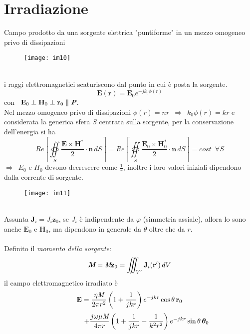 \documentclass[a4paper]{article}
\let\oldoiint\oiint
\renewcommand{\oiint}{\oldoiint\limits}
\begin{document}
\section{Irradiazione}
Campo prodotto da una sorgente elettrica "puntiforme" in un mezzo omogeneo privo di dissipazioni
\begin{figure}[ht] 
\centering
\texttt{[image: im10]}
\end{figure}
\\i raggi elettromagnetici scaturiscono dal punto in cui è posta la sorgente.
\begin{equation*}
\textbf{E}(\textbf{r})=\textbf{E}_0e^{-jk_0\phi(r)}
\end{equation*}
con $\,\,\,\textbf{E}_0\perp\textbf{H}_0\perp\textbf{r}_0\parallel\emph{\textbf{P}}$.\\
Nel mezzo omogeneo privo di dissipazioni $\phi(r)=nr\,\,\,\Rightarrow\,\,\,k_0\phi(r)=kr$ e considerata la generica sfera $S$ centrata sulla sorgente, per la conservazione dell'energia si ha
\begin{equation*}
Re\left[\oiint_S\frac{\textbf{E}\times\textbf{H}^*}{2}\cdot\textbf{n}\,dS\right]=Re\left[\oiint_S\frac{\textbf{E}_0\times\textbf{H}_0^*}{2}\cdot\textbf{n}\,dS\right]=cost\,\,\,\forall S
\end{equation*}
$\Rightarrow\,\,\,E_0$ e $H_0$ devono decrescere come $\frac{1}{r}$, inoltre i loro valori iniziali dipendono dalla corrente di sorgente.
\begin{figure}[ht] 
\centering
\texttt{[image: im11]}
\end{figure}
\\Assunta $\textbf{J}_i=J_i\textbf{z}_0$, se $J_i$ è indipendente da $\varphi$ (simmetria assiale), allora lo sono anche $\textbf{E}_0$ e $\textbf{H}_0$, ma dipendono in generale da $\theta$ oltre che da $r$.\\\\
Definito il \emph{momento della sorgente}:
\begin{equation*}
\emph{\textbf{M}}=\emph{M}\textbf{z}_0=\iiint_{V'}\textbf{J}_i(\textbf{r}')\,dV
\end{equation*}
il campo elettromagnetico irradiato è
\begin{equation*}
\textbf{E}=\frac{\eta\emph{M}}{2\pi r^2}\left(1+\frac{1}{jkr}\right)e^{-jkr}\cos\theta\,\textbf{r}_0
\end{equation*}
\begin{equation*}
\hspace*{17mm}+\frac{j\omega\mu\emph{M}}{4\pi r}\left(1+\frac{1}{jkr}-\frac{1}{k^2r^2}\right)e^{-jkr}\sin\theta\,\bm{\theta}_0
\end{equation*}
\end{document}
